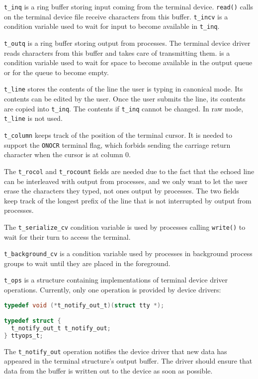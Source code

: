 \documentclass[shortabstract, manyadvisors, english, mgr]{iithesis}
\begin{document}
\texttt{t\_inq} is a ring buffer storing input coming from the terminal device.
\texttt{read()} calls on the terminal device file receive characters from this
buffer. \texttt{t\_incv} is a condition variable used to wait for input to
become available in \texttt{t\_inq}.

\texttt{t\_outq} is a ring buffer storing output from processes. The terminal
device driver reads characters from this buffer and takes care of transmitting
them.  is a condition variable used to wait for space to become
available in the output queue or for the queue to become empty.

\texttt{t\_line} stores the contents of the line the user is typing in canonical
mode. Its contents can be edited by the user. Once the user submits the line,
its contents are copied into \texttt{t\_inq}. The contents if \texttt{t\_inq}
cannot be changed. In raw mode, \texttt{t\_line} is not used.

\texttt{t\_column} keeps track of the position of the terminal cursor. It is
needed to support the \texttt{ONOCR} terminal flag, which forbids sending the
carriage return character when the cursor is at column 0.

The \texttt{t\_rocol} and \texttt{t\_rocount} fields are needed due to the fact
that the echoed line can be interleaved with output from processes, and we only
want to let the user erase the characters they typed, not ones output by
processes. The two fields keep track of the longest prefix of the line that is
not interrupted by output from processes.

The \texttt{t\_serialize\_cv} condition variable is used by processes calling
\texttt{write()} to wait for their turn to access the terminal.

\texttt{t\_background\_cv} is a condition variable used by processes in background
process groups to wait until they are placed in the foreground.

\texttt{t\_ops} is a structure containing implementations of terminal device
driver operations. Currently, only one operation is provided by device drivers:

\noindent
\begin{minipage}{\linewidth}
\begin{lstlisting}[language=c,
caption={\texttt{include/sys/tty.h}: definition of \texttt{ttyops\_t}.}]
typedef void (*t_notify_out_t)(struct tty *);

typedef struct {
  t_notify_out_t t_notify_out;
} ttyops_t;
\end{lstlisting}
\end{minipage}
The \texttt{t\_notify\_out} operation notifies the device driver that new data
has appeared in the terminal structure's output buffer. The driver should ensure
that data from the buffer is written out to the device as soon as possible.
\end{document}
